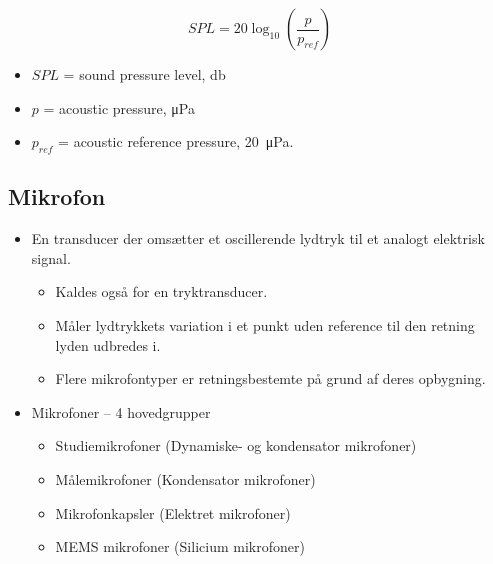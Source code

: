 \begin{equation}\label{eq:spl1}
SPL = 20\log_{10}\left(\frac{p}{p_{ref}}\right)
\end{equation}

\begin{itemize}
	\item $SPL$ = sound pressure level, \si{\decibel}
	\item $p$ = acoustic pressure, \si{\micro\pascal}
	\item $p_{ref}$ = acoustic reference pressure, \SI{20}{\micro\pascal}.
\end{itemize}

\subsection{Mikrofon}
\begin{itemize}
	\item En transducer der omsætter et oscillerende lydtryk til et analogt elektrisk signal.
	\begin{itemize}
		\item Kaldes også for en tryktransducer.
		\item Måler lydtrykkets variation i et punkt uden reference til den retning lyden udbredes i.
		\item Flere mikrofontyper er retningsbestemte på grund af deres opbygning.
	\end{itemize}
	\item Mikrofoner – 4 hovedgrupper
	\begin{itemize}
		\item Studiemikrofoner (Dynamiske- og kondensator mikrofoner)
		\item Målemikrofoner (Kondensator mikrofoner)
		\item Mikrofonkapsler (Elektret mikrofoner)
		\item MEMS mikrofoner (Silicium mikrofoner)
	\end{itemize}
\end{itemize}


